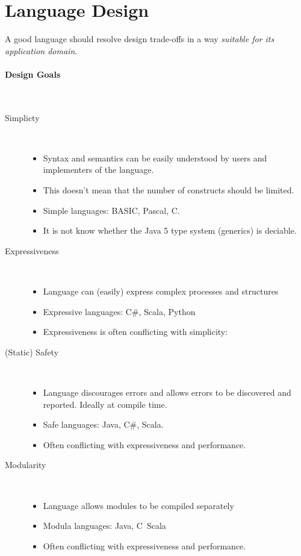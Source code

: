 \section{Language Design}
A good language should resolve design trade-offs in a way \emph{suitable for its application domain}.
\paragraph{Design Goals} $\text{}$
\begin{description}
 \item[Simplicty] $\text{}$
  \begin{itemize}
   \item Syntax and semantics can be easily understood by users and implementers of the language.
   \item This doesn't mean that the number of constructs should be limited.
   \item Simple languages: BASIC, Pascal, C.
   \item It is not know whether the Java 5 type system (generics) is deciable.
  \end{itemize}
 \item[Expressiveness]  $\text{}$
  \begin{itemize}
   \item Language can (easily) express complex processes and structures
   \item Expressive languages: C\#, Scala, Python
   \item Expressiveness is often conflicting with simplicity:
  \end{itemize}
 \item[(Static) Safety] $\text{}$
  \begin{itemize}
   \item Language discourages errors and allows errors to be discovered and reported. Ideally at compile time.
   \item Safe languages: Java, C\#, Scala.
   \item Often conflicting with expressiveness and performance.
  \end{itemize}
 \item[Modularity]  $\text{}$
  \begin{itemize}
   \item Language allows modules to be compiled separately
   \item Modula languages: Java, C\, Scala
   \item Often conflicting with expressiveness and performance. 

\end{itemize}
\end{description}
